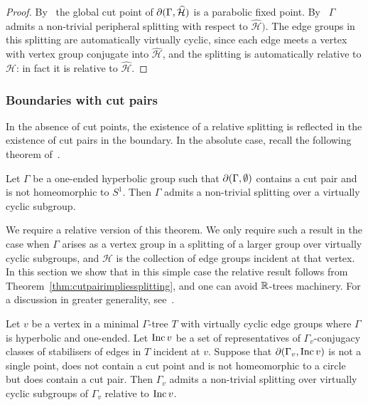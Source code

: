 \begin{proof} By~\cite[Theorem 0.2]{bowditch99a} the global cut
  point of $\partial(\Gamma, \widehat{\mathcal{H}})$ is a parabolic fixed point.
By~\cite[Theorem 1.2]{bowditch99b} $\Gamma$ admits a non-trivial peripheral
splitting with respect to $\widehat{\mathcal{H}})$. The edge groups in this splitting
are automatically virtually cyclic, since each edge meets a vertex with vertex
group conjugate into $\widehat{\mathcal{H}}$, and the splitting is automatically
relative to $\mathcal{H}$: in fact it is relative to $\widehat{\mathcal{H}}$.
\end{proof}

\subsubsection{Boundaries with cut pairs}

In the absence of cut points, the existence of a relative splitting is
reflected in the existence of cut pairs in the boundary.  In the absolute case,
recall the following theorem of~\cite{bowditch98}.

\begin{thm}\cite[Theorem 6.2]{bowditch98}\label{thm:cutpairimpliessplitting}
Let $\Gamma$ be a one-ended hyperbolic group such that $\partial(\Gamma,
\emptyset)$ contains a cut pair and is not homeomorphic to $S^1$. Then $\Gamma$
admits a non-trivial splitting over a virtually cyclic subgroup.  \end{thm}

We require a relative version of this theorem. We only require such a result in the case
when $\Gamma$ arises as a vertex group in a splitting of a larger group over
virtually cyclic subgroups, and $\mathcal{H}$ is the collection of edge groups
incident at that vertex. In this section we show that in this simple case the
relative result follows from Theorem~\ref{thm:cutpairimpliessplitting}, and one
can avoid $\mathbb{R}$-trees machinery. For a discussion in greater generality,
see~\cite{groff13}.

\begin{prop}\label{prop:cutpairimpliesrelativesplitting} Let $v$ be a vertex in
a minimal $\Gamma$-tree $T$ with virtually cyclic edge groups where $\Gamma$
is hyperbolic and one-ended. Let $\operatorname{\mathrm{Inc}} v$ be a set of representatives of
$\Gamma_v$-conjugacy classes of stabilisers of edges in $T$ incident at $v$.
Suppose that $\partial(\Gamma_v, \operatorname{\mathrm{Inc}} v)$ is not a single point, does not
contain a cut point and is not homeomorphic to a circle but does contain a
cut pair. Then $\Gamma_v$ admits a non-trivial splitting over virtually cyclic
subgroups of $\Gamma_v$ relative to $\operatorname{\mathrm{Inc}} v$.  \end{prop}

